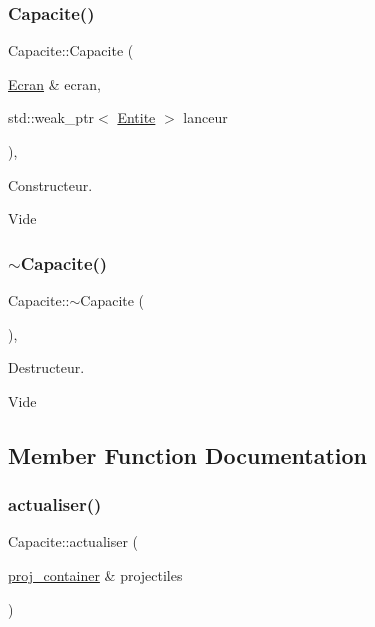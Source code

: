 \subsubsection{\texorpdfstring{Capacite()}{Capacite()}}
{\footnotesize\ttfamily Capacite\+::\+Capacite (\begin{DoxyParamCaption}\item[{\mbox{\hyperlink{class_ecran}{Ecran}} \&}]{ecran,  }\item[{std\+::weak\+\_\+ptr$<$ \mbox{\hyperlink{class_entite}{Entite}} $>$}]{lanceur }\end{DoxyParamCaption})\hspace{0.3cm}{\ttfamily [inline]}, {\ttfamily [explicit]}}



Constructeur. 

Vide \mbox{\label{class_capacite_a43be1570a24a64682ff3f034330779a9}} 
\subsubsection{\texorpdfstring{$\sim$\+Capacite()}{~Capacite()}}
{\footnotesize\ttfamily Capacite\+::$\sim$\+Capacite (\begin{DoxyParamCaption}{ }\end{DoxyParamCaption})\hspace{0.3cm}{\ttfamily [virtual]}, {\ttfamily [default]}}



Destructeur. 

Vide 

\subsection{Member Function Documentation}
\mbox{\label{class_capacite_a85355aeb1d4acc049ed97da177acbd5f}} 
\subsubsection{\texorpdfstring{actualiser()}{actualiser()}}
{\footnotesize\ttfamily Capacite\+::actualiser (\begin{DoxyParamCaption}\item[{\mbox{\hyperlink{def__type_8h_a87980cd8ee9533e561a73e8bbc728188}{proj\+\_\+container}} \&}]{projectiles }\end{DoxyParamCaption})\hspace{0.3cm}{\ttfamily [pure virtual]}}



